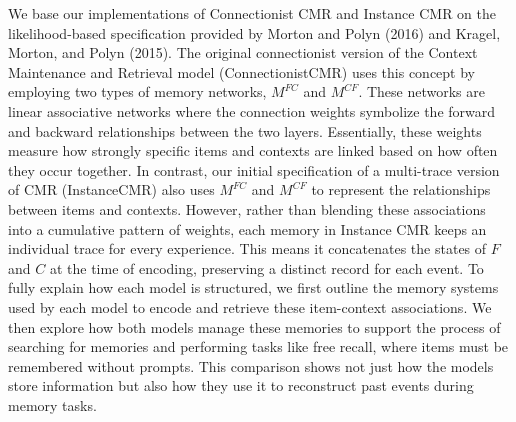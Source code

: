\documentclass[
  letterpaper,
  11pt,
  english,
  singlespacing,
  headsepline]{MastersDoctoralThesis}
\begin{document}
We base our implementations of Connectionist CMR and Instance CMR on the
likelihood-based specification provided by Morton and Polyn (2016) and
Kragel, Morton, and Polyn (2015). The original connectionist version of
the Context Maintenance and Retrieval model (ConnectionistCMR) uses this
concept by employing two types of memory networks, \(M^{FC}\) and
\(M^{CF}\). These networks are linear associative networks where the
connection weights symbolize the forward and backward relationships
between the two layers. Essentially, these weights measure how strongly
specific items and contexts are linked based on how often they occur
together. In contrast, our initial specification of a multi-trace
version of CMR (InstanceCMR) also uses \(M^{FC}\) and \(M^{CF}\) to
represent the relationships between items and contexts. However, rather
than blending these associations into a cumulative pattern of weights,
each memory in Instance CMR keeps an individual trace for every
experience. This means it concatenates the states of \(F\) and \(C\) at
the time of encoding, preserving a distinct record for each event. To
fully explain how each model is structured, we first outline the memory
systems used by each model to encode and retrieve these item-context
associations. We then explore how both models manage these memories to
support the process of searching for memories and performing tasks like
free recall, where items must be remembered without prompts. This
comparison shows not just how the models store information but also how
they use it to reconstruct past events during memory tasks.
\end{document}

